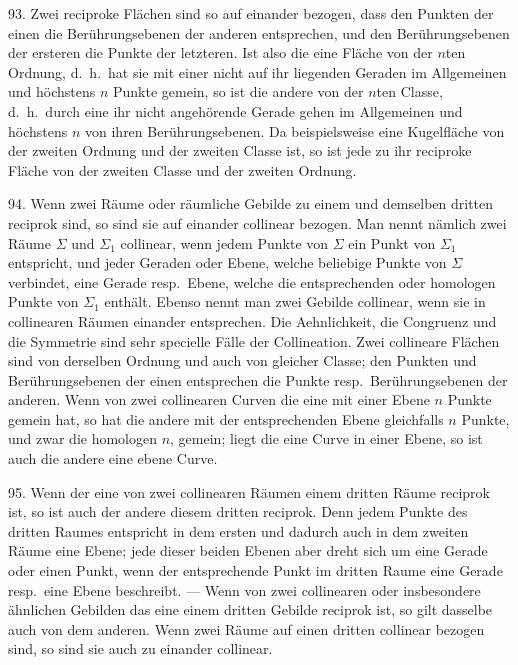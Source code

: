 93. Zwei reciproke Fl\"achen sind so auf einander bezogen,
dass den Punkten der einen die Ber\"uhrungsebenen
der anderen entsprechen, und den Be\-r\"uh\-rungs\-ebenen der
ersteren die Punkte der letzteren. Ist also die eine Fl\"ache
{\glqq}von der $n$ten Ordnung{\grqq}, d.~h.\ hat sie mit einer nicht auf
ihr liegenden Geraden im Allgemeinen und h\"ochstens $n$ Punkte
gemein, so ist die andere {\glqq}von der $n$ten Classe{\grqq}, d.~h.\ durch
eine ihr nicht angeh\"orende Gerade gehen im Allgemeinen
und h\"ochstens $n$ von ihren Ber\"uhrungsebenen. Da beispielsweise
eine Kugelfl\"ache von der zweiten Ordnung und der
zweiten Classe ist, so ist jede zu ihr reciproke Fl\"ache von
der zweiten Classe und der zweiten Ordnung.

94. Wenn zwei R\"aume oder r\"aumliche Gebilde zu einem
und demselben dritten reciprok sind, so sind sie auf einander
{\glqq}collinear{\grqq} bezogen. Man nennt n\"amlich zwei R\"aume $\varSigma$ und
$\varSigma_1$ collinear, wenn jedem Punkte von $\varSigma$ ein Punkt von $\varSigma_1$
entspricht, und jeder Geraden oder Ebene, welche beliebige
Punkte von $\varSigma$ verbindet, eine Gerade resp.\ Ebene, welche
die entsprechenden oder {\glqq}homologen{\grqq} Punkte von $\varSigma_1$ enth\"alt.
Ebenso nennt man zwei Gebilde collinear, wenn sie
in collinearen R\"aumen einander entsprechen. Die Aehnlichkeit,
die Congruenz und die Symmetrie sind sehr specielle
F\"alle der Collineation. Zwei collineare Fl\"achen sind von
derselben Ordnung und auch von gleicher Classe; den Punkten
und Ber\"uhrungsebenen der einen entsprechen die Punkte
resp.\ Ber\"uhrungsebenen der anderen. Wenn von zwei collinearen
Curven die eine mit einer Ebene $n$ Punkte gemein
hat, so hat die andere mit der entsprechenden Ebene gleichfalls
$n$ Punkte, und zwar die homologen $n$, gemein; liegt die
eine Curve in einer Ebene, so ist auch die andere eine
ebene Curve.

95. Wenn der eine von zwei collinearen R\"aumen einem
dritten R\"aume reciprok ist, so ist auch der andere diesem
dritten reciprok. Denn jedem Punkte des dritten Raumes
entspricht in dem ersten und dadurch auch in dem zweiten
R\"aume eine Ebene; jede dieser beiden Ebenen aber dreht
sich um eine Gerade oder einen Punkt, wenn der entsprechende
Punkt im dritten Raume eine Gerade resp.\ eine Ebene
beschreibt. --- Wenn von zwei collinearen oder insbesondere
\"ahnlichen Gebilden das eine einem dritten Gebilde reciprok
ist, so gilt dasselbe auch von dem anderen. Wenn zwei
R\"aume auf einen dritten collinear bezogen sind, so sind sie
auch zu einander collinear.

